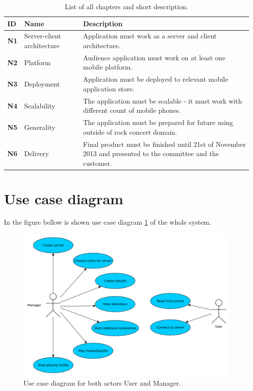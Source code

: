 \begin{table}[!h]\centering
\caption{List of all chapters and short description. }
\label{tab:req_nonfunc}
\def\arraystretch{1.3}
\begin{tabularx}{\textwidth}{llX}
\toprule[1mm]
\textbf{ID} & Name & Description\\
\midrule
\textbf{N1} & Server-client architecture & Application must work as a server and client architecture.\\
\textbf{N2} & Platform & Audience application must work on at least one mobile platform.\\
\textbf{N3} & Deployment & Application must be deployed to relevant mobile application store.\\
\textbf{N4} & Scalability & The application must be scalable - it must work with different count of mobile phones.\\
\textbf{N5} & Generality & The application must be prepared for future using outside of rock concert domain.\\
\textbf{N6} & Delivery & Final product must be finished until 21st of November 2013 and presented to the committee and the customer.\\
\bottomrule[1mm]

\end{tabularx}
\end{table}
\section{Use case diagram}
In the figure bellow is shown use case diagram \ref{img:usecase} of the whole system.

\begin{figure}[h]
    \begin{center}
    \includegraphics[scale=0.4]{images/usecase.pdf}
    \caption{Use case diagram for both actors User and Manager.}
    \label{img:usecase}
    \end{center}
\end{figure}


